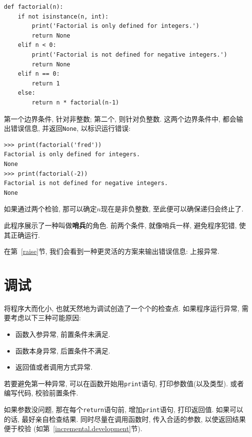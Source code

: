 \documentclass[10pt]{book}
\begin{document}
\begin{verbatim}
def factorial(n):
    if not isinstance(n, int):
        print('Factorial is only defined for integers.')
        return None
    elif n < 0:
        print('Factorial is not defined for negative integers.')
        return None
    elif n == 0:
        return 1
    else:
        return n * factorial(n-1)
\end{verbatim}
%
第一个边界条件, 针对非整数;
第二个, 则针对负整数. 
这两个边界条件中, 都会输出错误信息, 并返回{\tt None}, 
以标识运行错误:

\begin{verbatim}
>>> print(factorial('fred'))
Factorial is only defined for integers.
None
>>> print(factorial(-2))
Factorial is not defined for negative integers.
None
\end{verbatim}
% 
如果通过两个检验, 那可以确定$n$现在是非负整数, 
至此便可以确保递归会终止了. 

此程序展示了一种叫做{\bf 哨兵}的角色. 
前两个条件, 就像哨兵一样, 避免程序犯错, 使其正确运行. 

在第~\ref{raise}节, 我们会看到一种更灵活的方案来输出错误信息: 上报异常. 


\section{调试}
\label{factdebug}
将程序大而化小, 也就天然地为调试创造了一个个的检查点. 
如果程序运行异常, 需要考虑以下三种可能原因:

\begin{itemize}

\item 函数入参异常, 前置条件未满足. 

\item 函数本身异常, 后置条件不满足. 

\item 返回值或者调用方式异常. 

\end{itemize}

若要避免第一种异常, 可以在函数开始用{\tt  print}语句, 打印参数值(以及类型). 
或者编写代码, 校验前置条件. 

如果参数没问题, 那在每个{\tt return}语句前, 增加{\tt print}语句, 打印返回值. 
如果可以的话, 最好亲自检查结果. 同时尽量在调用函数时, 传入合适的参数, 
以使返回结果便于校验
(如第~\ref{incremental.development}节). 
\end{document}
